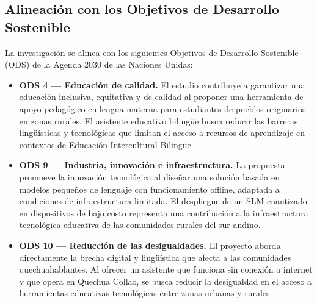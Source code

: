 \subsection{Alineación con los Objetivos de Desarrollo Sostenible}
La investigación se alinea con los siguientes Objetivos de Desarrollo Sostenible (ODS) de la Agenda 2030 de las Naciones Unidas:

\begin{itemize}
	\item \textbf{ODS 4 — Educación de calidad.} El estudio contribuye a garantizar una educación inclusiva, equitativa y de calidad al proponer una herramienta de apoyo pedagógico en lengua materna para estudiantes de pueblos originarios en zonas rurales. El asistente educativo bilingüe busca reducir las barreras lingüísticas y tecnológicas que limitan el acceso a recursos de aprendizaje en contextos de Educación Intercultural Bilingüe.

	\item \textbf{ODS 9 — Industria, innovación e infraestructura.} La propuesta promueve la innovación tecnológica al diseñar una solución basada en modelos pequeños de lenguaje con funcionamiento offline, adaptada a condiciones de infraestructura limitada. El despliegue de un SLM cuantizado en dispositivos de bajo costo representa una contribución a la infraestructura tecnológica educativa de las comunidades rurales del sur andino.

	\item \textbf{ODS 10 — Reducción de las desigualdades.} El proyecto aborda directamente la brecha digital y lingüística que afecta a las comunidades quechuahablantes. Al ofrecer un asistente que funciona sin conexión a internet y que opera en Quechua Collao, se busca reducir la desigualdad en el acceso a herramientas educativas tecnológicas entre zonas urbanas y rurales.
\end{itemize}
